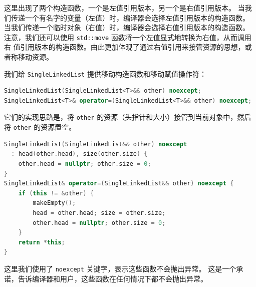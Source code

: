 \documentclass[a4paper]{ctexart}
\theoremstyle{definition}
\theoremstyle{definition}
\begin{document}
这里出现了两个构造函数，一个是左值引用版本，另一个是右值引用版本。 当我们传递一个有名字的变量（左值）时，编译器会选择左值引用版本的构造函数。
当我们传递一个临时对象（右值）时，编译器会选择右值引用版本的构造函数。 注意，我们还可以使用 \verb|std::move| 函数将一个左值显式地转换为右值，从而调用右
值引用版本的构造函数。由此更加体现了通过右值引用来接管资源的思想，或者称移动资源。

我们给 \verb|SingleLinkedList| 提供移动构造函数和移动赋值操作符：
\begin{lstlisting}[language=c++]
SingleLinkedList(SingleLinkedList<T>&& other) noexcept;
SingleLinkedList<T>& operator=(SingleLinkedList<T>&& other) noexcept;
\end{lstlisting}
它们的实现思路是，将 \verb|other| 的资源（头指针和大小）接管到当前对象中，然后将 \verb|other| 的资源置空。
\begin{lstlisting}[language=c++]
SingleLinkedList(SingleLinkedList&& other) noexcept
  : head(other.head), size(other.size) {
    other.head = nullptr; other.size = 0;
}
SingleLinkedList& operator=(SingleLinkedList&& other) noexcept {
    if (this != &other) {
        makeEmpty();
        head = other.head; size = other.size;
        other.head = nullptr; other.size = 0;
    }
    return *this;
}
\end{lstlisting}
这里我们使用了 \verb|noexcept| 关键字，表示这些函数不会抛出异常。 这是一个承诺，告诉编译器和用户，这些函数在任何情况下都不会抛出异常。 





\end{document}
